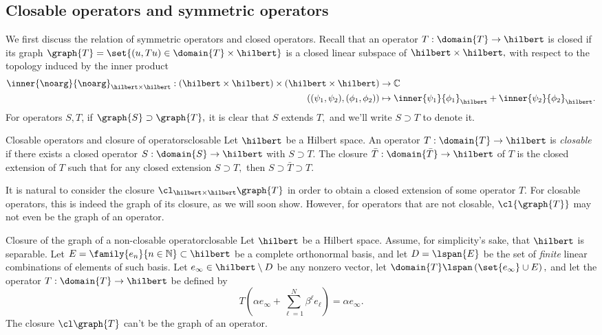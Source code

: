 \subsection{Closable operators and symmetric operators}
We first discuss the relation of symmetric operators and closed operators. Recall that an operator \(T : \domain{T} \to \hilbert\) is closed if its graph \(\graph{T} = \set{(u, Tu) \in \domain{T} \times \hilbert}\) is a closed linear subspace of \(\hilbert \times \hilbert,\) with respect to the topology induced by the inner product 
\begin{align*}
    \inner{\noarg}{\noarg}_{\hilbert \times \hilbert} : (\hilbert\times\hilbert) \times (\hilbert \times \hilbert) &\to \mathbb{C}\\
    ((\psi_1, \psi_2),(\phi_1,\phi_2)) &\mapsto \inner{\psi_1}{\phi_1}_\hilbert + \inner{\psi_2}{\phi_2}_\hilbert.
\end{align*}
For operators \(S, T\), if \(\graph{S} \supset \graph{T},\) it is clear that \(S\) extends \(T,\) and we'll write \(S \supset T\) to denote it.
\begin{definition}{Closable operators and closure of operators}{closable}
    Let \(\hilbert\) be a Hilbert space. An operator \(T : \domain{T} \to \hilbert\) is \emph{closable} if there exists a closed operator \(S : \domain{S} \to \hilbert\) with \(S \supset T.\) The closure \(\bar{T} : \domain{\bar{T}} \to \hilbert\) of \(T\) is the closed extension of \(T\) such that for any closed extension \(S \supset T,\) then \(S \supset \bar{T} \supset T.\)
\end{definition}
It is natural to consider the closure \(\cl_{\hilbert \times \hilbert}{\graph{T}}\) in order to obtain a closed extension of some operator \(T.\) For closable operators, this is indeed the graph of its closure, as we will soon show. However, for operators that are not closable, \(\cl{\graph{T}}\) may not even be the graph of an operator.
\begin{example}{Closure of the graph of a non-closable operator}{closable}
    Let \(\hilbert\) be a Hilbert space. Assume, for simplicity's sake, that \(\hilbert\) is separable. Let \(E = \family{e_n}{n \in \mathbb{N}} \subset \hilbert\) be a complete orthonormal basis, and let \(D = \lspan{E}\) be the set of \emph{finite} linear combinations of elements of such basis. Let \(e_\infty \in \hilbert \setminus D\) be any nonzero vector, let \(\domain{T} \lspan\left(\set{e_\infty} \cup E\right),\) and let the operator \(T : \domain{T} \to \hilbert\) be defined by
    \begin{equation*}
        T \left(\alpha e_{\infty} + \sum_{\ell = 1}^{N}{\beta^\ell e_\ell}\right) = \alpha e_{\infty}.
    \end{equation*}
    The closure \(\cl \graph{T}\) can't be the graph of an operator.
\end{example}
